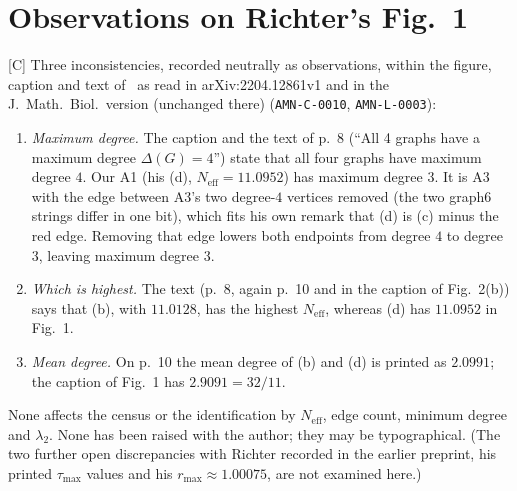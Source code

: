 \documentclass[10pt]{article}
\newcommand{\tier}[1]{\textsf{[#1]}}
\newcommand{\tC}{\tier{C}}
\newcommand{\Neff}{N_{\mathrm{eff}}}
\begin{document}
\section{Observations on Richter's Fig.~1}\label{sec:rich}
\tC{} Three inconsistencies, recorded neutrally as observations, within the figure, caption and text of~\cite{rich22} as read in arXiv:2204.12861v1 and in the J.\ Math.\ Biol.\ version (unchanged there) (\texttt{AMN-C-0010}, \texttt{AMN-L-0003}):
\begin{enumerate}\itemsep=0pt
\item \emph{Maximum degree.} The caption and the text of p.~8 (``All 4 graphs have a maximum degree $\Delta(G)=4$'') state that all four graphs have maximum degree $4$. Our A1 (his (d), $\Neff=11.0952$) has maximum degree $3$. It is A3 with the edge between A3's two degree-$4$ vertices removed (the two graph6 strings differ in one bit), which fits his own remark that (d) is (c) minus the red edge. Removing that edge lowers both endpoints from degree $4$ to degree $3$, leaving maximum degree $3$.
\item \emph{Which is highest.} The text (p.~8, again p.~10 and in the caption of Fig.~2(b)) says that (b), with $11.0128$, has the highest $\Neff$, whereas (d) has $11.0952$ in Fig.~1.
\item \emph{Mean degree.} On p.~10 the mean degree of (b) and (d) is printed as $2.0991$; the caption of Fig.~1 has $2.9091=32/11$.
\end{enumerate}
None affects the census or the identification by $\Neff$, edge count, minimum degree and $\lambda_2$. None has been raised with the author; they may be typographical. (The two further open discrepancies with Richter recorded in the earlier preprint, his printed $\tau_{\max}$ values and his $r_{\max}\approx1.00075$, are not examined here.)

\end{document}
